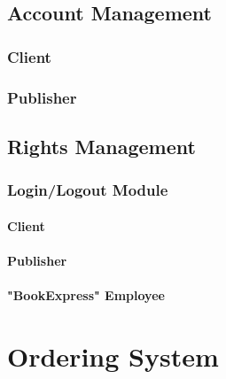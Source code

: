 \documentclass[11pt,a4paper,oneside,svgnames]{report}
\begin{document}
\subsection{Account Management}

\subsubsection{Client}
\subsubsection{Publisher}

\subsection{Rights Management}

\subsubsection{Login/Logout Module}
\paragraph{Client}
\paragraph{Publisher}
\paragraph{"BookExpress" Employee}


\section{Ordering System}
\end{document}
